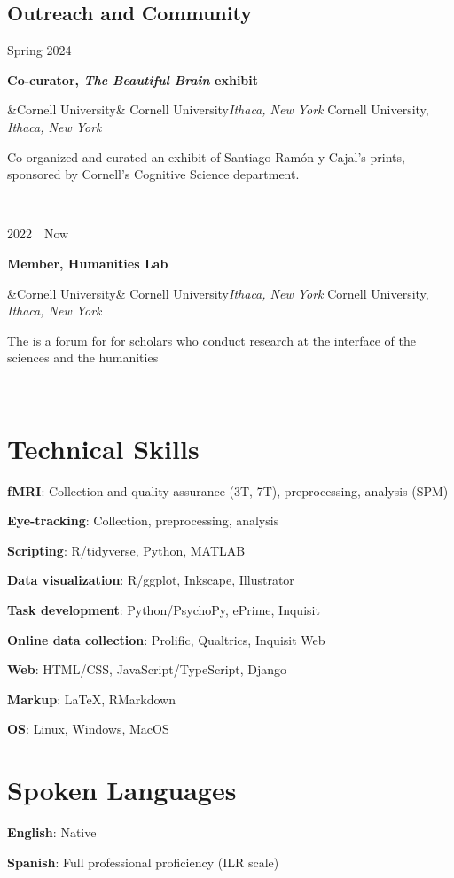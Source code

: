 \documentclass{article}
\newcommand{\entry}[5]{

  \begin{minipage}[t]{.15\textwidth}
    \begin{flushright}
      \hfill {#1}
    \end{flushright}
  \end{minipage}
  \hfill\vline\hfill
  \begin{minipage}[t]{.80\textwidth}
    \textbf{#2}

    \ifx&#3&
      {#3}\textit{#4}
    \else
      {#3, }\textit{#4}

    \fi
    \footnotesize{#5}
  \end{minipage}\\\vspace{.25cm}
}
\newcommand{\skillentry}[2]{
  {\hspace{2em}\textbf{#1}:}
  {#2}
  \vspace{.25cm}
}
\newcommand{\cu}{Cornell University}
\let\oldhref\href
\renewcommand{\href}[3][blue]{\oldhref{#2}{\color{#1}{#3}}}
\begin{document}
\subsection{Outreach and Community}

\entry{Spring 2024}{Co-curator, \textit{The Beautiful Brain} exhibit}
{\cu}{Ithaca, New York}
{Co-organized and curated an exhibit of Santiago Ramón y Cajal's prints, sponsored by Cornell's Cognitive Science department.}

\entry{2022~\textendash~Now}{Member, Humanities Lab}
{\cu}{Ithaca, New York}
{The \href{https://blogs.cornell.edu/humanitieslab/}{Humanities Lab} is a forum for for scholars who conduct research at the interface of the sciences and the humanities}


\section{Technical Skills}

\skillentry{fMRI}
{Collection and quality assurance (3T, 7T), preprocessing, analysis (SPM)}

\skillentry{Eye-tracking}{Collection, preprocessing, analysis}

\skillentry{Scripting}{R/tidyverse, Python, MATLAB}

\skillentry{Data visualization}{R/ggplot, Inkscape, Illustrator}

\skillentry{Task development}
{Python/PsychoPy, ePrime, Inquisit}

\skillentry{Online data collection}
{Prolific, Qualtrics, Inquisit Web}

\skillentry{Web}{HTML/CSS, JavaScript/TypeScript, Django}

\skillentry{Markup}{\LaTeX, RMarkdown}

\skillentry{OS}{Linux, Windows, MacOS}

\section{Spoken Languages}
\skillentry{English}{Native}

\skillentry{Spanish}{Full professional proficiency (ILR scale)}


\raggedleft
\href{https://github.com/opmorgan/cv}{Source code for this CV}
\end{document}
